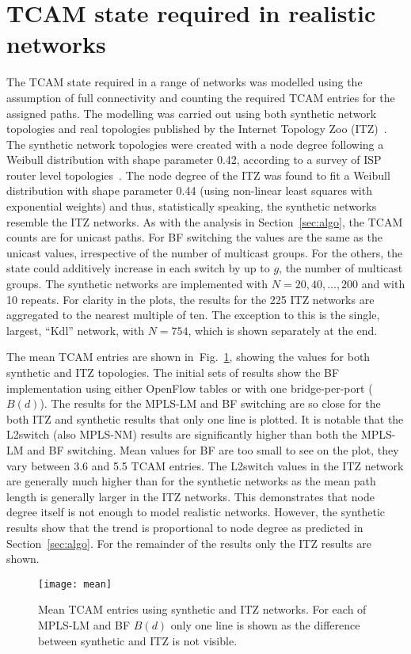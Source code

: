 \documentclass[conference]{IEEEtran}
\newcommand{\figref}[1]{Fig.~\ref{#1}}
\begin{document}
\section{TCAM state required in realistic networks}
\label{sec:results}

The TCAM state required in a range of networks was modelled using the assumption of full connectivity and counting the required TCAM entries for the assigned paths. The modelling was carried out using both synthetic network topologies and real topologies published by the Internet Topology Zoo (ITZ)~\cite{Knight11}. The synthetic network topologies were created with a node degree following a Weibull distribution with shape parameter 0.42, according to a survey of ISP router level topologies~\cite{Spring02}. The node degree of the ITZ was found to fit a Weibull distribution with shape parameter 0.44 (using non-linear least squares with exponential weights) and thus, statistically speaking, the synthetic networks resemble the ITZ networks. As with the analysis in Section~\ref{sec:algo}, the TCAM counts are for unicast paths.  For BF switching the values are the same as the unicast values, irrespective of the number of multicast groups. For the others, the state could additively increase in each switch by up to $g$, the number of multicast groups. The synthetic networks are implemented with $N=20,40,\ldots,200$ and with 10 repeats. For clarity in the plots, the results for the 225 ITZ networks are aggregated to the nearest multiple of ten. The exception to this is the single, largest, ``Kdl'' network, with $N=754$, which is shown separately at the end.

The mean TCAM entries are shown in~\figref{fig:synthMean}, showing the values for both synthetic and ITZ topologies. The initial sets of results show the BF implementation using either OpenFlow tables or with one bridge-per-port ($B(d)$). The results for the MPLS-LM and BF switching are so close for the both ITZ and synthetic results that only one line is plotted. It is notable that the L2switch (also MPLS-NM) results are significantly higher than both the MPLS-LM and BF switching. Mean values for BF are too small to see on the plot, they vary between 3.6 and 5.5 TCAM entries. The L2switch values in the ITZ network are generally much higher than for the synthetic networks as the mean path length is generally larger in the ITZ networks. This demonstrates that node degree itself is not enough to model realistic networks. However, the synthetic results show that the trend is proportional to node degree as predicted in Section~\ref{sec:algo}. For the remainder of the results only the ITZ results are shown.
\begin{figure}[tb]
  \centering
\texttt{[image: mean]}
  \caption{Mean TCAM entries using synthetic and ITZ networks. For
    each of MPLS-LM and BF $B(d)$ only one line is shown as the difference between
    synthetic and ITZ is not visible.}
  \label{fig:synthMean}
\end{figure}
\end{document}
